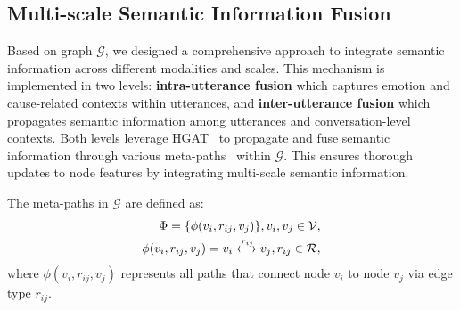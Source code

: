 \documentclass[11pt]{article}
\begin{document}
\subsection{Multi-scale Semantic Information Fusion}
\label{method-4.5}
Based on graph $\mathcal{G}$, we designed a comprehensive approach to integrate semantic information across different modalities and scales.
This mechanism is implemented in two levels: \textbf{intra-utterance fusion} which captures emotion and cause-related contexts within utterances, and \textbf{inter-utterance fusion} which propagates semantic information among utterances and conversation-level contexts.
Both levels leverage HGAT~\cite{HAN} to propagate and fuse semantic information through various meta-paths~\cite{HAN} within $\mathcal{G}$.
This ensures thorough updates to node features by integrating multi-scale semantic information.

The meta-paths in $\mathcal{G}$ are defined as:
\begin{equation}
\begin{aligned}
\Phi = \{\phi(v_i, r_{ij}, v_j)\}, v_i, v_j \in \mathcal{V}, \\
\phi(v_i, r_{ij}, v_j) = v_i \xleftrightarrow{r_{ij}} v_j, r_{ij} \in \mathcal{R},
\end{aligned}
\end{equation}
where $\phi(v_i, r_{ij}, v_j)$ represents all paths that connect node $v_i$ to node $v_j$ via edge type $r_{ij}$.
\end{document}
